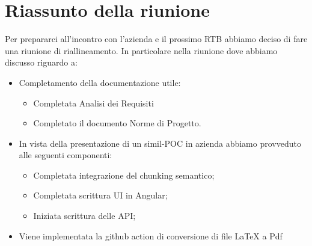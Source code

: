 \section{Riassunto della riunione}
Per prepararci all'incontro con l'azienda e il prossimo RTB abbiamo deciso di fare una riunione di riallineamento. In particolare nella riunione dove abbiamo discusso riguardo a:
\begin{itemize}
    \item Completamento della documentazione utile:
    \begin{itemize}
        \item Completata Analisi dei Requisiti
        \item Completato il documento Norme di Progetto.
    \end{itemize}
    \item In vista della presentazione di un simil-POC in azienda abbiamo provveduto alle seguenti componenti:
    \begin{itemize}
        \item Completata integrazione del chunking semantico;
        \item Completata scrittura UI in Angular;
        \item Iniziata scrittura delle API;
    \end{itemize}
    \item Viene implementata la github action di conversione di file LaTeX a Pdf

\end{itemize}